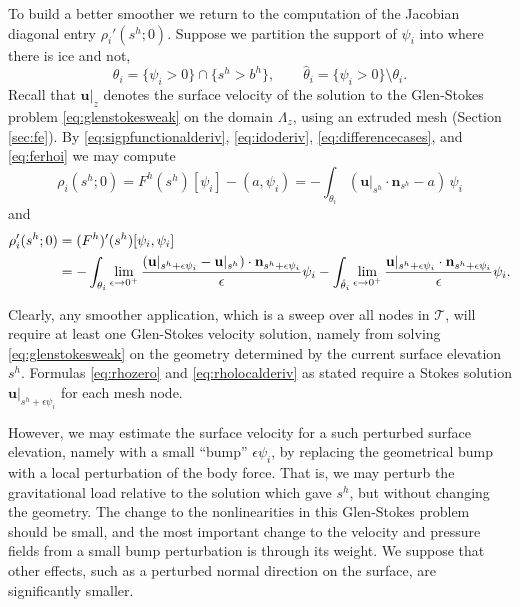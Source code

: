 \documentclass[letterpaper,final,12pt,reqno]{amsart}
\theoremstyle{claim}
\newcommand{\eps}{\epsilon}
\newcommand{\bn}{\mathbf{n}}
\newcommand{\bu}{\mathbf{u}}
\newcommand{\ip}[2]{\left(#1,#2\right)}
\numberwithin{equation}{section}
\numberwithin{figure}{section}
\numberwithin{table}{section}
\numberwithin{theorem}{section}
\begin{document}
To build a better smoother we return to the computation of the Jacobian diagonal entry $\rho_i'(s^h; 0)$.  Suppose we partition the support of $\psi_i$ into where there is ice and not,
\begin{equation}
\theta_i = \{\psi_i > 0\} \cap \{s^h > b^h\}, \qquad {\hat\theta}_i = \{\psi_i > 0\} \setminus \theta_i.  \label{eq:thetasupport}
\end{equation}
Recall that $\bu|_{z}$ denotes the surface velocity of the solution to the Glen-Stokes problem \eqref{eq:glenstokesweak} on the domain $\Lambda_{z}$, using an extruded mesh (Section \ref{sec:fe}).  By \eqref{eq:sigpfunctionalderiv}, \eqref{eq:idoderiv}, \eqref{eq:differencecases}, and \eqref{eq:ferhoi} we may compute
\begin{equation}
\rho_i(s^h; 0) = F^h(s^h)[\psi_i] - \ip{a}{\psi_i} = - \int_{\theta_i} (\bu|_{s^h} \cdot \bn_{s^h}- a)\, \psi_i  \label{eq:rhozero}
\end{equation}
and
\begin{align}
\rho_i'(s^h; 0) &= (F^h)'(s^h)[\psi_i,\psi_i]  \label{eq:rholocalderiv} \\
  &= - \int_{\theta_i} \lim_{\eps\to 0^+} \frac{(\bu|_{s^h+\eps\psi_i} - \bu|_{s^h}) \cdot \bn_{s^h+\eps\psi_i}}{\eps} \psi_i - \int_{{\hat\theta}_i} \lim_{\eps\to 0^+} \frac{\bu|_{s^h+\eps\psi_i} \cdot \bn_{s^h+\eps\psi_i}}{\eps} \psi_i.  \notag
\end{align}

Clearly, any smoother application, which is a sweep over all nodes in $\mathcal{T}$, will require at least one Glen-Stokes velocity solution, namely from solving \eqref{eq:glenstokesweak} on the geometry determined by the current surface elevation $s^h$.  Formulas \eqref{eq:rhozero} and \eqref{eq:rholocalderiv} as stated require a Stokes solution $\bu|_{s^h+\eps\psi_i}$ for each mesh node.

However, we may estimate the surface velocity for a such perturbed surface elevation, namely with a small ``bump'' $\eps\psi_i$, by replacing the geometrical bump with a local perturbation of the body force.  That is, we may perturb the gravitational load relative to the solution which gave $s^h$, but without changing the geometry.  The change to the nonlinearities in this Glen-Stokes problem should be small, and the most important change to the velocity and pressure fields from a small bump perturbation is through its weight.  We suppose that other effects, such as a perturbed normal direction on the surface, are significantly smaller.
\end{document}
